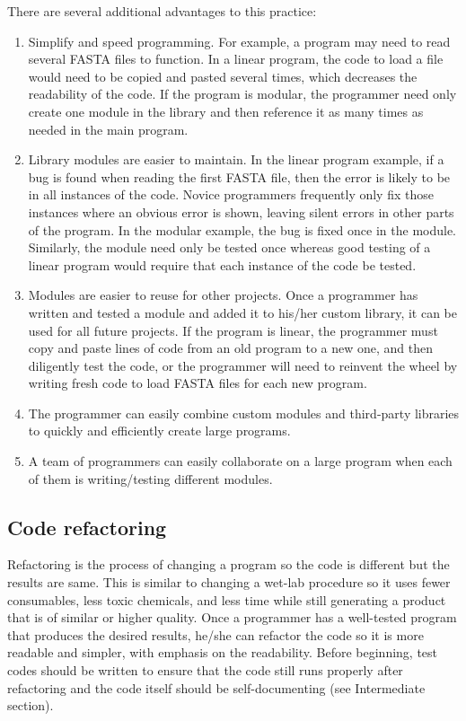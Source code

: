 \documentclass[ChapterTOCs,krantz2]{krantz} %
\begin{document}
There are several additional advantages to this practice:  
\begin{enumerate}

\item Simplify and speed programming.  For example, a program may need to read
several FASTA files to function.  In a linear program, the
code to load a file would need to be copied and pasted several times,
which decreases the readability of the code.  If the program is modular, the
programmer need only create one module in the library and then reference it as
many times as needed in the main program.  

\item Library modules are easier to maintain.  
In the linear program example, if a bug is found when
reading the first FASTA file, then the error is likely to be in all instances
of the code.  Novice programmers frequently only fix those
instances where an obvious error is shown, leaving silent errors in other parts
of the program.  In the modular example, the bug is fixed once in the module.  
Similarly, the module need only be
tested once whereas good testing of a linear program would require that each
instance of the code be tested.  

\item Modules are
easier to reuse for other projects.  Once a programmer has written and tested a
module and added it to his/her custom library, it
can be used for all future projects.  If the program is linear, the programmer
must copy and paste lines of code from an old program to a new one, and then
diligently test the code, or the
programmer will need to reinvent the wheel by writing fresh code to load FASTA
files for each new program.  

\item The programmer can easily combine custom
modules and third-party libraries to quickly and efficiently create large
programs.  

\item A team of programmers can easily collaborate on a large
program when each of them is writing/testing different modules.  

\end{enumerate}


\subsection{Code refactoring}

Refactoring is the process of changing a program so the code is different but
the results are same.  This is similar to changing a wet-lab procedure  
so it uses fewer consumables, less toxic chemicals, and less time while still
generating a product that is of similar or higher quality.  Once a programmer has a
well-tested program that produces the desired results, he/she can refactor the
code so it is more readable and simpler, with emphasis on the readability.
Before beginning, test codes should be written to ensure that the code still
runs properly after refactoring and the code itself should be self-documenting
(see Intermediate section). 
\end{document}
